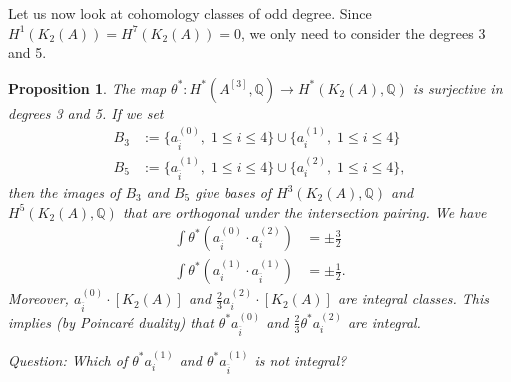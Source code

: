 \documentclass{amsart}
\newcommand{\hilb}[1]{^{[#1]}}
\newcommand{\kum}[2]{K_{ #2 }( #1 )}
\newcommand{\Q}{\mathbb{Q}}
\theoremstyle{plain}
\newtheorem{proposition}[theorem]{Proposition}
\theoremstyle{definition}
\theoremstyle{remark}
\begin{document}
Let us now look at cohomology classes of odd degree. Since $H^1(\kum{A}{2}) = H^7(\kum{A}{2}) =0$, we only need to consider the degrees 3 and 5.
\begin{proposition}
The map $\theta^* : H^*(A\hilb{3} ,\Q) \rightarrow H^*(\kum{A}{2},\Q)$ is surjective in degrees 3 and 5. 
If we set
\begin{align}
B_3 &:= \{ a_{\overline{i}}^{(0)},\; 1\leq i\leq 4\} \cup \{ a_{i}^{(1)},\; 1\leq i\leq 4\}  \\
B_5 &:= \{ a_{\overline{i}}^{(1)},\; 1\leq i\leq 4\} \cup \{ a_{i}^{(2)},\; 1\leq i\leq 4\} ,
\end{align}
then the images of $B_3$ and $B_5$ give bases of $H^3(\kum{A}{2},\Q)$ and $H^5(\kum{A}{2},\Q)$ that are orthogonal under the intersection pairing.
We have
\begin{align}
\int \theta^* \left( a_{\overline{ i}}^{(0)} \cdot  a_i^{(2)}  \right ) &= \pm \frac{3}{2} \\
\int \theta^* \left( a_i^{(1)} \cdot a_{\overline{ i}}^{(1)} \right ) &= \pm \frac{1}{2}.
\end{align}
Moreover, $a_{\overline{ i}}^{(0)}\cdot[\kum{A}{2}]$ and $\frac{2}{3} a_i^{(2)}\cdot[\kum{A}{2}]$ are integral classes. 
This implies (by Poincar\'e duality) that $\theta^* a_{\overline{ i}}^{(0)}$ and $\frac{2}{3} \theta^*a_i^{(2)} $ are integral. 

Question: Which of $\theta^*  a_i^{(1)} $ and $ \theta^*a_{\overline{ i}}^{(1)}$ is not integral?
\end{proposition}
 
\end{document}
